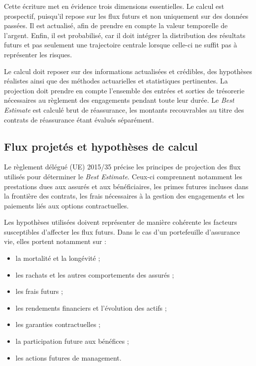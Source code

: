 Cette écriture met en évidence trois dimensions essentielles. Le calcul est
prospectif, puisqu'il repose sur les flux futurs et non uniquement sur
des données passées. Il est actualisé, afin de prendre en compte la
valeur temporelle de l'argent. Enfin, il est probabilisé, car il doit
intégrer la distribution des résultats futurs et pas seulement une trajectoire
centrale lorsque celle-ci ne suffit pas à représenter les risques.

Le calcul doit reposer sur des informations actualisées et crédibles, des
hypothèses réalistes ainsi que des méthodes actuarielles et statistiques pertinentes. La projection doit prendre en compte
l'ensemble des entrées et sorties de trésorerie nécessaires au règlement des
engagements pendant toute leur durée. Le \textit{Best Estimate} est calculé
brut de réassurance, les montants recouvrables au titre des contrats de
réassurance étant évalués séparément.

\subsection{Flux projetés et hypothèses de calcul}

Le règlement délégué (UE) 2015/35 précise les principes de projection des flux
utilisés pour déterminer le \textit{Best Estimate}. Ceux-ci comprennent notamment les prestations dues
aux assurés et aux bénéficiaires, les primes futures incluses dans la frontière
des contrats, les frais nécessaires à la gestion des engagements et les
paiements liés aux options contractuelles.

Les hypothèses utilisées doivent représenter de manière cohérente les facteurs
susceptibles d'affecter les flux futurs. Dans le cas d'un portefeuille
d'assurance vie, elles portent notamment sur :

\begin{itemize}
    \item la mortalité et la longévité ;
    \item les rachats et les autres comportements des assurés ;
    \item les frais futurs ;
    \item les rendements financiers et l'évolution des actifs ;
    \item les garanties contractuelles ;
    \item la participation future aux bénéfices ;
    \item les actions futures de management.
\end{itemize}

